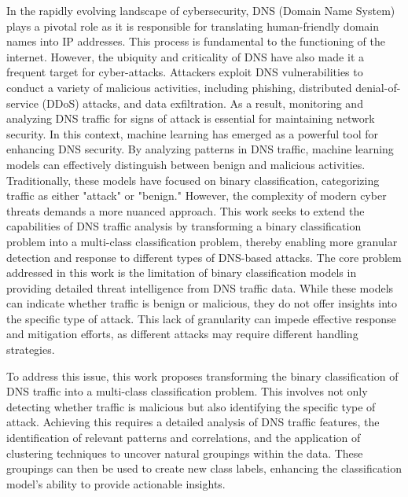 

In the rapidly evolving landscape of cybersecurity, DNS (Domain Name System) plays a pivotal role as it is responsible for translating human-friendly domain names into IP addresses. This process is fundamental to the functioning of the internet. However, the ubiquity and criticality of DNS have also made it a frequent target for cyber-attacks. Attackers exploit DNS vulnerabilities to conduct a variety of malicious activities, including phishing, distributed denial-of-service (DDoS) attacks, and data exfiltration. As a result, monitoring and analyzing DNS traffic for signs of attack is essential for maintaining network security.
In this context, machine learning has emerged as a powerful tool for enhancing DNS security. By analyzing patterns in DNS traffic, machine learning models can effectively distinguish between benign and malicious activities. Traditionally, these models have focused on binary classification, categorizing traffic as either "attack" or "benign." However, the complexity of modern cyber threats demands a more nuanced approach. This work seeks to extend the capabilities of DNS traffic analysis by transforming a binary classification problem into a multi-class classification problem, thereby enabling more granular detection and response to different types of DNS-based attacks.
The core problem addressed in this work is the limitation of binary classification models in providing detailed threat intelligence from DNS traffic data. While these models can indicate whether traffic is benign or malicious, they do not offer insights into the specific type of attack. This lack of granularity can impede effective response and mitigation efforts, as different attacks may require different handling strategies.

To address this issue, this work proposes transforming the binary classification of DNS traffic into a multi-class classification problem. This involves not only detecting whether traffic is malicious but also identifying the specific type of attack. Achieving this requires a detailed analysis of DNS traffic features, the identification of relevant patterns and correlations, and the application of clustering techniques to uncover natural groupings within the data. These groupings can then be used to create new class labels, enhancing the classification model's ability to provide actionable insights.

